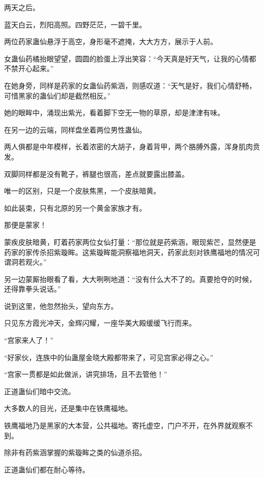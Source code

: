 
\begin{this_body}



两天之后。

蓝天白云，烈阳高照。四野茫茫，一碧千里。

两位药家蛊仙悬浮于高空，身形毫不遮掩，大大方方，展示于人前。

女蛊仙药橘抬眼望望，圆圆的脸蛋上浮出笑容：“今天真是好天气，让我的心情都不禁开心起来。”

在她身旁，同样是药家的女蛊仙药紫涵，则感叹道：“天气是好，我们心情舒畅，可惜黑家的蛊仙们却是截然相反。”

她的眼眸中，涌现出紫光，看着脚下空无一物的草原，却是津津有味。

在另一边的云端，同样盘坐着两位男性蛊仙。

两人俱都是中年模样，长着浓密的大胡子，身着背甲，两个胳膊外露，浑身肌肉贲发。

双脚同样都是没有靴子，裤腿也很高，差点就要露出膝盖。

唯一的区别，只是一个皮肤焦黑，一个皮肤暗黄。

如此装束，只有北原的另一个黄金家族才有。

那便是蒙家！

蒙疾皮肤暗黄，盯着药家两位女仙打量：“那位就是药紫涵，眼现紫芒，显然便是药家的家传杀招紫璇眸。这紫璇眸能洞察福地洞天，药家此刻对铁鹰福地的情况可谓洞若观火。”

另一边蒙厮抬眼看了看，大大咧咧地道：“没有什么大不了的。真要抢夺的时候，还得靠拳头说话。”

说到这里，他忽然抬头，望向东方。

只见东方霞光冲天，金辉闪耀，一座华美大殿缓缓飞行而来。

“宫家来人了！”

“好家伙，连族中的仙蛊屋金晓大殿都带来了，可见宫家必得之心。”

“宫家一贯都是如此做派，讲究排场，且不去管他！”

正道蛊仙们暗中交流。

大多数人的目光，还是集中在铁鹰福地。

铁鹰福地乃是黑家的大本营，公共福地。寄托虚空，门户不开，在外界就观察不到。

除非有药紫涵掌握的紫璇眸之类的仙道杀招。

正道蛊仙们都在耐心等待。


\end{this_body}
